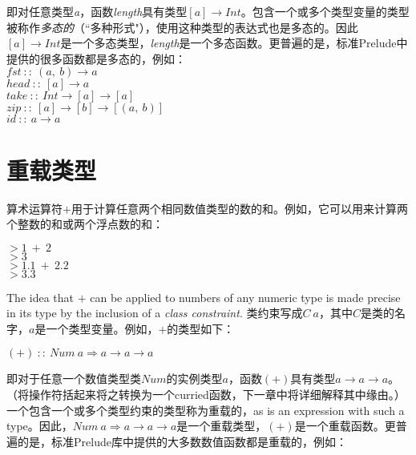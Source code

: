 即对任意类型\textit{a}，函数\textit{length}具有类型$[a]
\rightarrow
Int$。包含一个或多个类型变量的类型被称作\textit{多态的}（“多种形式"），使用这种类型的表达式也是多态的。因此$[a] \rightarrow
Int$是一个多态类型，\textit{length}是一个多态函数。更普遍的是，标准Prelude中提供的很多函数都是多态的，例如：\\
\hspace*{1cm} $fst~::~(a,~b) \rightarrow a$\\
\hspace*{1cm} $head~::~[a] \rightarrow a$\\
\hspace*{1cm} $take~::~Int \rightarrow [a] \rightarrow [a]$\\
\hspace*{1cm} $zip~::~[a] \rightarrow [b] \rightarrow [(a,~b)]$\\
\hspace*{1cm} $id~::~a \rightarrow a$

\section{重载类型}

算术运算符$+$用于计算任意两个相同数值类型的数的和。例如，它可以用来计算两个整数的和或两个浮点数的和：

\noindent\hspace*{1cm} $> 1~+~2$\\
\hspace*{1cm} $> 3$\\

\noindent\hspace*{1cm} $> 1.1~+~2.2$\\
\hspace*{1cm} $> 3.3$

The idea that $+$ can be applied to numbers of any numeric type is made precise in its type by the inclusion of a \textit{class constraint}.  类约束写成$C~a$，其中$C$是类的名字，$a$是一个类型变量。例如，$+$的类型如下： 

\noindent\hspace*{1cm} $(+)~::~Num~a \Rightarrow  a \rightarrow a \rightarrow a$

即对于任意一个数值类型类$Num$的实例类型$a$，函数$(+)$具有类型$a \rightarrow a
\rightarrow a$。（将操作符括起来将之转换为一个curried函数，下一章中将详细解释其中缘由。）一个包含一个或多个类型约束的类型称为重载的，as
is an expression with such a type。因此，$Num~a \Rightarrow  a \rightarrow a
\rightarrow
a$是一个重载类型，$(+)$是一个重载函数。更普遍的是，标准Prelude库中提供的大多数数值函数都是重载的，例如：

